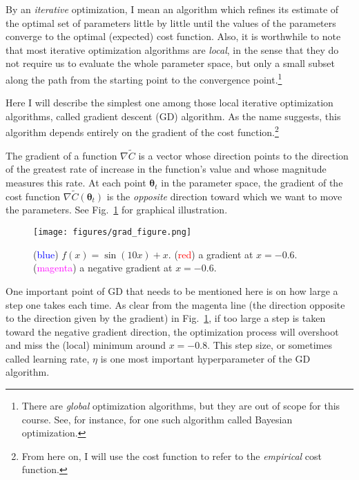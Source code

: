 \documentclass{report}
\newcommand{\vects}[1]{\boldsymbol{#1}}
\newcommand{\TT}[0]{\vects{\theta}}
\begin{document}
By an {\em iterative} optimization, I mean an algorithm which refines its
estimate of the optimal set of parameters little by little until the values of
the parameters converge to the optimal (expected) cost function. Also, it is
worthwhile to note that most iterative optimization algorithms are {\em local},
in the sense that they do not require us to evaluate the whole parameter space,
but only a small subset along the path from the starting point to the
convergence point.\footnote{
    There are {\em global} optimization algorithms, but they are out of scope
    for this course. See, for instance, \citet{Brochu2010} for one such algorithm
    called Bayesian optimization.
}

Here I will describe the simplest one among those local iterative optimization
algorithms, called gradient descent (GD) algorithm. As the name suggests, this
algorithm depends entirely on the gradient of the cost function.\footnote{
    From here on, I will use the cost function to refer to the {\em empirical}
    cost function.
} 

The gradient of a function $\nabla \tilde{C}$ is a vector whose direction points
to the direction of the greatest rate of increase in the function's value and
whose magnitude measures this rate. At each point $\TT_t$ in the parameter
space, the gradient of the cost function $\nabla \tilde{C}(\TT_t)$ is the {\em
opposite} direction toward which we want to move the parameters. See
Fig.~\ref{fig:grad} for graphical illustration.

\begin{figure}
    \centering
    \begin{minipage}{0.6\textwidth}
        \texttt{[image: figures/grad\_figure.png]}
    \end{minipage}
    \hfill
    \begin{minipage}{0.39\textwidth}
        \caption{(\textcolor{blue}{blue}) $f(x) = \sin(10 x) + x$.
            (\textcolor{red}{red}) a gradient at $x=-0.6$.
        (\textcolor{magenta}{magenta}) a negative gradient at $x=-0.6$.}
        \label{fig:grad}
    \end{minipage}
\end{figure}

One important point of GD that needs to be mentioned here is on how large a step
one takes each time. As clear from the magenta line (the direction opposite to
the direction given by the gradient) in Fig.~\ref{fig:grad}, if too large a step
is taken toward the negative gradient direction, the optimization process will
overshoot and miss the (local) minimum around $x=-0.8$. This step size, or
sometimes called learning rate, $\eta$ is one most important hyperparameter of
the GD algorithm.
\end{document}
